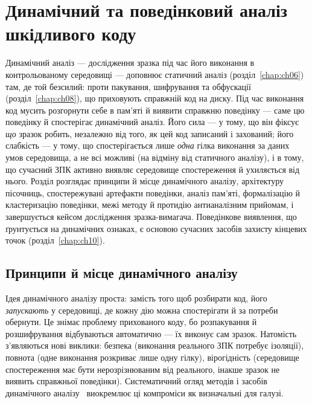 \chapter{Динамічний та поведінковий аналіз шкідливого коду}
\label{chap:ch07}

Динамічний аналіз --- дослідження зразка під час його виконання в контрольованому середовищі --- доповнює статичний аналіз (розділ~\ref{chap:ch06}) там, де той безсилий: проти пакування, шифрування та обфускації (розділ~\ref{chap:ch08}), що приховують справжній код на диску. Під час виконання код мусить розгорнути себе в пам'яті й виявити справжню поведінку --- саме цю поведінку й спостерігає динамічний аналіз. Його сила --- у тому, що він фіксує \emph{що} зразок робить, незалежно від того, \emph{як} цей код записаний і захований; його слабкість --- у тому, що спостерігається лише \emph{одна} гілка виконання за даних умов середовища, а не всі можливі (на відміну від статичного аналізу), і в тому, що сучасний ЗПК активно виявляє середовище спостереження й ухиляється від нього. Розділ розглядає принципи й місце динамічного аналізу, архітектуру пісочниць, спостережувані артефакти поведінки, аналіз пам'яті, формалізацію й кластеризацію поведінки, межі методу й протидію антианалізним прийомам, і завершується кейсом дослідження зразка-вимагача. Поведінкове виявлення, що ґрунтується на динамічних ознаках, є основою сучасних засобів захисту кінцевих точок (розділ~\ref{chap:ch10}).

\section{Принципи й місце динамічного аналізу}\label{sec:ch07-principles}

Ідея динамічного аналізу проста: замість того щоб розбирати код, його \emph{запускають} у середовищі, де кожну дію можна спостерігати й за потреби обернути. Це знімає проблему прихованого коду, бо розпакування й розшифрування відбуваються автоматично --- їх виконує сам зразок. Натомість з'являються нові виклики: безпека (виконання реального ЗПК потребує ізоляції), повнота (одне виконання розкриває лише одну гілку), вірогідність (середовище спостереження має бути нерозрізнюваним від реального, інакше зразок не виявить справжньої поведінки). Систематичний огляд методів і засобів динамічного аналізу~\cite{ch07:egele} виокремлює ці компроміси як визначальні для галузі.

